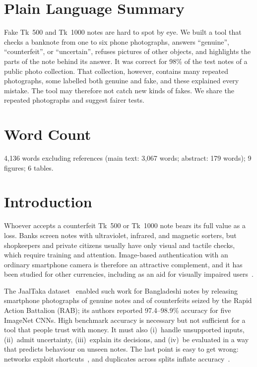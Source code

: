 \documentclass[pdflatex,sn-mathphys-num]{sn-jnl}
\begin{document}
\section*{Plain Language Summary}
Fake Tk~500 and Tk~1000 notes are hard to spot by eye. We built a tool that checks a
banknote from one to six phone photographs, answers ``genuine'', ``counterfeit'', or
``uncertain'', refuses pictures of other objects, and highlights the parts of the note
behind its answer. It was correct for 98\% of the test notes of a public photo
collection. That collection, however, contains many repeated photographs, some labelled
both genuine and fake, and these explained every mistake. The tool may therefore not
catch new kinds of fakes. We share the repeated photographs and suggest fairer tests.

\section*{Word Count}
4{,}136 words excluding references (main text: 3{,}067 words; abstract: 179 words);
9 figures; 6 tables.

\section{Introduction}\label{sec:intro}

Whoever accepts a counterfeit Tk~500 or Tk~1000 note bears its full value as a loss.
Banks screen notes with ultraviolet, infrared, and magnetic sorters, but shopkeepers and
private citizens usually have only visual and tactile checks, which require training and
attention. Image-based authentication with an ordinary smartphone camera is therefore an
attractive complement, and it has been studied for other currencies, including as an aid
for visually impaired users~\cite{pham2020,pham2022}.

The JaalTaka dataset~\cite{piyas2025jaaltaka} enabled such work for Bangladeshi notes by
releasing smartphone photographs of genuine notes and of counterfeits seized by the Rapid
Action Battalion (RAB); its authors reported 97.4--98.9\% accuracy for five ImageNet
CNNs. High benchmark accuracy is necessary but not sufficient for a tool that people
trust with money. It must also (i)~handle unsupported inputs, (ii)~admit uncertainty,
(iii)~explain its decisions, and (iv)~be evaluated in a way that predicts behaviour on
unseen notes. The last point is easy to get wrong: networks exploit
shortcuts~\cite{geirhos2020shortcut}, and duplicates across splits inflate
accuracy~\cite{kaufman2012leakage,barz2020cifair,kapoor2023leakage}.
\end{document}
